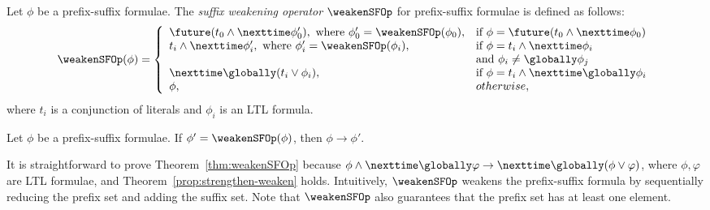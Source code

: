 \begin{definition}\label{def:weakenSFOp}
    Let $\phi$ be a prefix-suffix formulae. 
    The {\em suffix weakening operator} $\weakenSFOp$ for prefix-suffix formulae is defined as follows:
    \begin{equation}
        \nonumber
        \weakenSFOp(\phi) =
        \left\{
            \begin{array}{ll}
            \future(t_0 \land \nexttime \phi_0'), \text{ where } \phi_0' = \weakenSFOp(\phi_0), & \text{if } \phi = \future(t_0 \land \nexttime \phi_0)\\ 
            t_i \land \nexttime \phi_i', \text{ where } \phi_i' = \weakenSFOp(\phi_i), & \text{if } \phi = t_i \land \nexttime \phi_i\\
            &\text{and } \phi_i \neq \globally \phi_j\\
            \nexttime \globally (t_i \lor \phi_i), & \text{if } \phi = t_i \land \nexttime \globally \phi_i\\
            \phi, & otherwise,\\
            \end{array}
        \right.
    \end{equation}
    where $t_i$ is a conjunction of literals and $\phi_i$ is an LTL formula.
\end{definition}

\begin{theorem}\label{thm:weakenSFOp}
    Let $\phi$ be a prefix-suffix formulae. 
    If $\phi' = \weakenSFOp(\phi)$, then $\phi \to \phi'$.
\end{theorem}

It is straightforward to prove Theorem~\ref{thm:weakenSFOp} because $\phi \land \nexttime \globally \varphi \to \nexttime \globally (\phi \lor \varphi)$, where $\phi,\varphi$ are LTL formulae, and Theorem~\ref{prop:strengthen-weaken} holds.
Intuitively, $\weakenSFOp$ weakens the prefix-suffix formula by sequentially reducing the prefix set and adding the suffix set.
Note that $\weakenSFOp$ also guarantees that the prefix set has at least one element.

